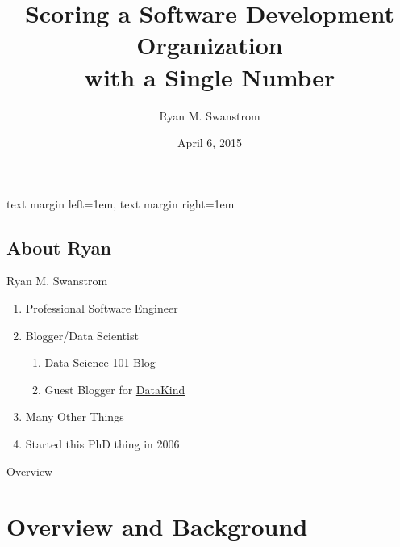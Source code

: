 \usepackage[english] {babel}
\usepackage[T1]      {fontenc}
\usepackage{hyperref}

\usepackage{amsmath, amsfonts, graphicx}
\usepackage{tikz}
\usepackage{csquotes}


\setbeamersize
  {text margin left=1em, text margin right=1em}

\title
  [Scoring an SDO]
  {Scoring a Software Development Organization\\ with a Single Number}

\author
  [Ryan]
  {Ryan M. Swanstrom}

\date
  {April 6, 2015}




\maketitle

\subsection{About Ryan}
\begin{frame}
  {Ryan M. Swanstrom}
  
  \begin{enumerate}
    \item Professional Software Engineer
    \item Blogger/Data Scientist
    \begin{enumerate}
        \item \href{http://101.datascience.community}{Data Science 101 Blog}
        \item Guest Blogger for \href{http://www.datakind.org/blog/}{DataKind}
    \end{enumerate}
    \item Many Other Things
    \item Started this PhD thing in 2006
  \end{enumerate}
\end{frame}

\begin{frame}{Overview}

  \tableofcontents

\end{frame}

\section{Overview and Background}

